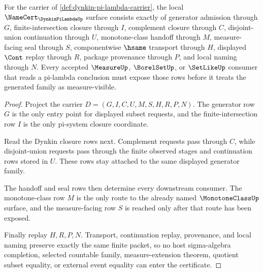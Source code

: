 \begin{theorem}
\label{thm:dynkin-pi-lambda-namecert-obligations}
For the carrier of \autoref{def:dynkin-pi-lambda-carrier}, the local $\NameCert_{\DynkinPiLambdaUp}$ surface consists exactly of generator admission through $G$, finite-intersection closure through $I$, complement closure through $C$, disjoint-union continuation through $U$, monotone-class handoff through $M$, measure-facing seal through $S$, componentwise $\hsame$ transport through $H$, displayed $\Cont$ replay through $R$, package provenance through $P$, and local naming through $N$. Every accepted $\MeasureUp$, $\BorelSetUp$, or $\SetLikeUp$ consumer that reads a pi-lambda conclusion must expose those rows before it treats the generated family as measure-visible.
\end{theorem}
\begin{proof}
Project the carrier $D=(G,I,C,U,M,S,H,R,P,N)$. The generator row $G$ is the only entry point for displayed subset requests, and the finite-intersection row $I$ is the only pi-system closure coordinate.

Read the Dynkin closure rows next. Complement requests pass through $C$, while disjoint-union requests pass through the finite observed stages and continuation rows stored in $U$. These rows stay attached to the same displayed generator family.

The handoff and seal rows then determine every downstream consumer. The monotone-class row $M$ is the only route to the already named $\MonotoneClassUp$ surface, and the measure-facing row $S$ is reached only after that route has been exposed.

Finally replay $H,R,P,N$. Transport, continuation replay, provenance, and local naming preserve exactly the same finite packet, so no host sigma-algebra completion, selected countable family, measure-extension theorem, quotient subset equality, or external event equality can enter the certificate.
\end{proof}

